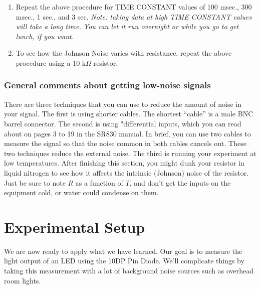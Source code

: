 \documentclass{../lab}
\begin{document}
\begin{enumerate}
    \item Repeat the above procedure for TIME CONSTANT values of 100 msec., 300 msec., 1 sec., and 3 sec. \emph{Note: taking data at high TIME CONSTANT values will take a long time. You can let it run overnight or while you go to get lunch, if you want.}
    
    \item To see how the Johnson Noise varies with resistance, repeat the above procedure using a 10 k$\Omega$ resistor.

\end{enumerate}


\subsubsection{General comments about getting low-noise signals}

There are three techniques that you can use to reduce the amount of noise in your signal. The first is using shorter cables. The shortest ``cable'' is a male BNC barrel connector. The second is using "differential inputs, which you can read about on pages 3 to 19 in the SR830 manual. In brief, you can use two cables to measure the signal so that the noise common in both cables cancels out. These two techniques reduce the external noise. The third is running your experiment at low temperatures. After finishing this section, you might dunk your resistor in liquid nitrogen to see how it affects the intrinsic (Johnson) noise of the resistor. Just be sure to note $R$ as a function of $T$, and don't get the inputs on the equipment cold, or water could condense on them.

\section{Experimental Setup}

We are now ready to apply what we have learned. Our goal is to measure the light output of an LED using the 10DP Pin Diode. We'll complicate things by taking this measurement with a lot of background noise sources such as overhead room lights.
\end{document}
